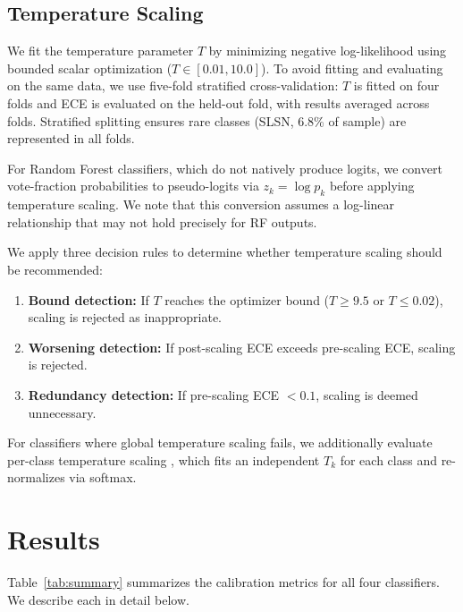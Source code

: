 \documentclass[twocolumn]{aastex631}
\begin{document}
\subsection{Temperature Scaling}

We fit the temperature parameter $T$ by minimizing negative log-likelihood using bounded scalar optimization ($T \in [0.01, 10.0]$). To avoid fitting and evaluating on the same data, we use five-fold stratified cross-validation: $T$ is fitted on four folds and ECE is evaluated on the held-out fold, with results averaged across folds. Stratified splitting ensures rare classes (SLSN, 6.8\% of sample) are represented in all folds.

For Random Forest classifiers, which do not natively produce logits, we convert vote-fraction probabilities to pseudo-logits via $z_k = \log p_k$ before applying temperature scaling. We note that this conversion assumes a log-linear relationship that may not hold precisely for RF outputs.

We apply three decision rules to determine whether temperature scaling should be recommended:
\begin{enumerate}
    \item \textbf{Bound detection:} If $T$ reaches the optimizer bound ($T \geq 9.5$ or $T \leq 0.02$), scaling is rejected as inappropriate.
    \item \textbf{Worsening detection:} If post-scaling ECE exceeds pre-scaling ECE, scaling is rejected.
    \item \textbf{Redundancy detection:} If pre-scaling ECE $< 0.1$, scaling is deemed unnecessary.
\end{enumerate}

For classifiers where global temperature scaling fails, we additionally evaluate per-class temperature scaling \citep{fang2020}, which fits an independent $T_k$ for each class and re-normalizes via softmax.


\section{Results} \label{sec:results}

Table~\ref{tab:summary} summarizes the calibration metrics for all four classifiers. We describe each in detail below.
\end{document}
